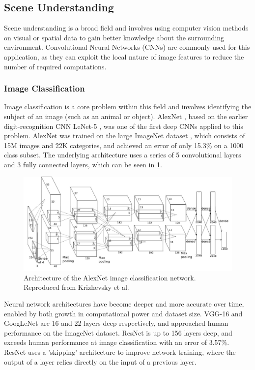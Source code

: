 \pagebreak
\subsection{Scene Understanding}
Scene understanding is a broad field and involves using computer vision methods
on visual or spatial data to gain better knowledge about the surrounding environment.
Convolutional Neural Networks (CNNs) are commonly used for this application, as they
can exploit the local nature of image features to reduce the number of required computations.

\subsubsection{Image Classification}
Image classification is a core problem within this field and involves identifying the subject of an image (such as an animal or object).
AlexNet \cite{krizhevskyImageNetClassificationDeep2012}, based on the earlier digit-recognition CNN LeNet-5
\cite{lecunGradientbasedLearningApplied1998}, was one of the first deep CNNs
applied to this problem. AlexNet was trained on the large ImageNet dataset \cite{jiadengImageNetLargescaleHierarchical2009},
which consists of 15M images and 22K categories,
and achieved an error of only 15.3\% on a 1000 class subset. The underlying architecture uses a series of 5 convolutional
layers and 3 fully connected layers, which can be seen in \cref{fig:alexnet_architecture}.

\begin{figure}[H]
    \centering
    \includegraphics[width=0.8\linewidth]{images/alexnet_architecture.png}
    \caption{Architecture of the AlexNet image classification network. Reproduced from Krizhevsky et al. \cite{krizhevskyImageNetClassificationDeep2012}}
    \label{fig:alexnet_architecture}
\end{figure}

Neural network architectures have become deeper and more accurate over time, enabled by both
growth in computational power and dataset size. VGG-16 \cite{simonyanVeryDeepConvolutional2014}
and GoogLeNet \cite{szegedyGoingDeeperConvolutions2014}
are 16 and 22 layers deep respectively, and approached
human performance on the ImageNet dataset. ResNet \cite{heDeepResidualLearning2016} is up to 156 layers deep,
and exceeds human performance at image classification with an error of 3.57\%.
ResNet uses a 'skipping' architecture to improve network training, where the output of a layer relies directly on
the input of a previous layer.


